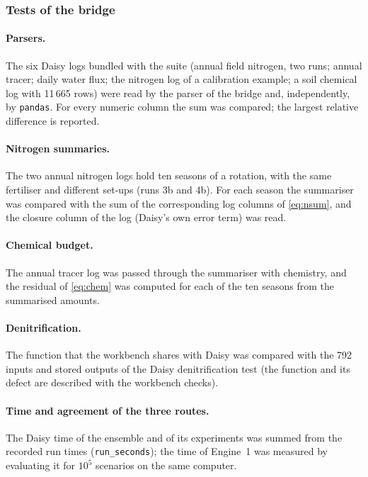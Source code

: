 \documentclass[preprint,12pt]{elsarticle}
\begin{document}
\subsubsection{Tests of the bridge}
\paragraph{Parsers.} The six Daisy logs bundled with the suite (annual field nitrogen, two runs; annual tracer; daily water flux; the nitrogen log of a calibration example; a soil chemical log with 11\,665 rows) were read by the parser of the bridge and, independently, by \texttt{pandas}. For every numeric column the sum was compared; the largest relative difference is reported.

\paragraph{Nitrogen summaries.} The two annual nitrogen logs hold ten seasons of a rotation, with the same fertiliser and different set-ups (runs 3b and 4b). For each season the summariser was compared with the sum of the corresponding log columns of \cref{eq:nsum}, and the closure column of the log (Daisy's own error term) was read.

\paragraph{Chemical budget.} The annual tracer log was passed through the summariser with chemistry, and the residual of \cref{eq:chem} was computed for each of the ten seasons from the summarised amounts.

\paragraph{Denitrification.} The function that the workbench shares with Daisy was compared with the 792 inputs and stored outputs of the Daisy denitrification test (the function and its defect are described with the workbench checks).

\paragraph{Time and agreement of the three routes.} The Daisy time of the ensemble and of its experiments was summed from the recorded run times (\texttt{run\_seconds}); the time of Engine~1 was measured by evaluating it for $10^5$ scenarios on the same computer.
\end{document}
